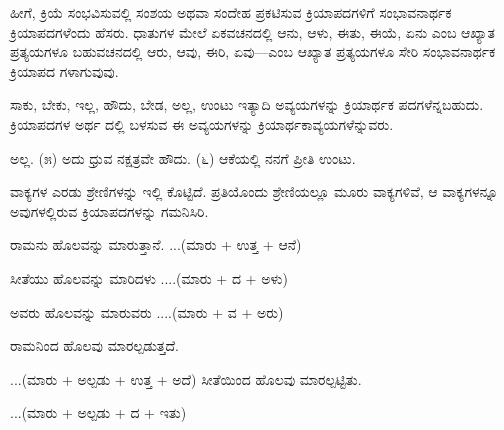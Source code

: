 \indent ಹೀಗೆ, ಕ್ರಿಯೆ ಸಂಭವಿಸುವಲ್ಲಿ ಸಂಶಯ ಅಥವಾ ಸಂದೇಹ ಪ್ರಕಟಿಸುವ ಕ್ರಿಯಾಪದಗಳಿಗೆ ಸಂಭಾವನಾರ್ಥಕ ಕ್ರಿಯಾಪದಗಳೆಂದು ಹೆಸರು. ಧಾತುಗಳ ಮೇಲೆ ಏಕವಚನದಲ್ಲಿ ಆನು, ಆಳು, ಈತು, ಈಯೆ, ಏನು ಎಂಬ ಆಖ್ಯಾತ ಪ್ರತ್ಯಯಗಳೂ ಬಹುವಚನದಲ್ಲಿ ಆರು, ಆವು, ಈರಿ, ಏವು—ಎಂಬ ಆಖ್ಯಾತ ಪ್ರತ್ಯಯಗಳೂ ಸೇರಿ ಸಂಭಾವನಾರ್ಥಕ ಕ್ರಿಯಾಪದ ಗಳಾಗುವುವು.\par

\begin{kbvrule}
\noindent\kbvbullet\hspace{0.5em}ಸಾಕು, ಬೇಕು, ಇಲ್ಲ, ಹೌದು, ಬೇಡ, ಅಲ್ಲ, ಉಂಟು ಇತ್ಯಾದಿ ಅವ್ಯಯಗಳನ್ನು ಕ್ರಿಯಾರ್ಥಕ ಪದಗಳೆನ್ನಬಹುದು. ಕ್ರಿಯಾಪದಗಳ ಅರ್ಥ ದಲ್ಲಿ ಬಳಸುವ ಈ ಅವ್ಯಯಗಳನ್ನು ಕ್ರಿಯಾರ್ಥಕಾವ್ಯಯಗಳೆನ್ನುವರು.
\end{kbvrule}

\begin{kbvderiv}
\vspace{4pt plus 3pt minus 1pt}
\vspace{4pt plus 3pt minus 1pt}
\end{kbvderiv}

\indent ಅಲ್ಲ. (೫) ಅದು ಧ್ರುವ ನಕ್ಷತ್ರವೇ ಹೌದು. (೬) ಆಕೆಯಲ್ಲಿ ನನಗೆ ಪ್ರೀತಿ ಉಂಟು.\par


\indent ವಾಕ್ಯಗಳ ಎರಡು ಶ್ರೇಣಿಗಳನ್ನು ಇಲ್ಲಿ ಕೊಟ್ಟಿದೆ. ಪ್ರತಿಯೊಂದು ಶ್ರೇಣಿಯಲ್ಲೂ ಮೂರು ವಾಕ್ಯಗಳಿವೆ, ಆ ವಾಕ್ಯಗಳನ್ನೂ ಅವುಗಳಲ್ಲಿರುವ ಕ್ರಿಯಾಪದಗಳನ್ನು ಗಮನಿಸಿರಿ.\par


\indent ರಾಮನು ಹೊಲವನ್ನು ಮಾರುತ್ತಾನೆ. ...(ಮಾರು + ಉತ್ತ + ಆನೆ)\par

\indent ಸೀತೆಯು ಹೊಲವನ್ನು ಮಾರಿದಳು ....(ಮಾರು + ದ + ಅಳು)\par

\indent ಅವರು ಹೊಲವನ್ನು ಮಾರುವರು ....(ಮಾರು + ವ + ಅರು)\par


\noindent\hspace*{2.2em}ರಾಮನಿಂದ ಹೊಲವು ಮಾರಲ್ಪಡುತ್ತದೆ.\par

\indent ...(ಮಾರು + ಅಲ್ಪಡು + ಉತ್ತ + ಅದೆ) ಸೀತೆಯಿಂದ ಹೊಲವು ಮಾರಲ್ಪಟ್ಟಿತು.\par

\indent ...(ಮಾರು + ಅಲ್ಪಡು + ದ + ಇತು)\par

